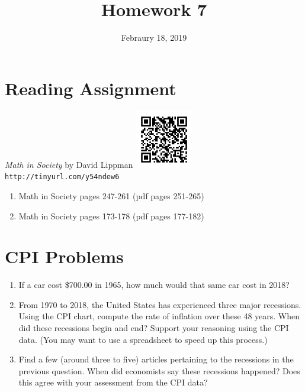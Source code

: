 \documentclass{article}
\title{Homework 7}
\date{Febraury 18, 2019}
\begin{document}
\maketitle

\section*{Reading Assignment}
\begin{center}
    {\em Math in Society} by David Lippman\newline
    \includegraphics[width=1in]{readings/society}\newline
    {\tt http://tinyurl.com/y54ndew6}
\end{center}
\begin{enumerate}
\item Math in Society pages 247-261 (pdf pages 251-265)
\item Math in Society pages 173-178 (pdf pages 177-182)
\end{enumerate}

\section{CPI Problems}
\begin{enumerate}
\item If a car cost \$700.00 in 1965, how much would that same car cost in 2018?
\item From 1970 to 2018, the United States has experienced three major recessions.  
Using the CPI chart, compute the rate of inflation over these 48 years.  When did
these recessions begin and end?  Support your reasoning using the CPI data.  (You 
may want to use a spreadsheet to speed up this process.)
\item Find a few (around three to five) articles pertaining to the recessions in the
previous question. When did economists say these recessions happened?  Does this agree
with your assessment from the CPI data?
\end{enumerate}
\end{document}
